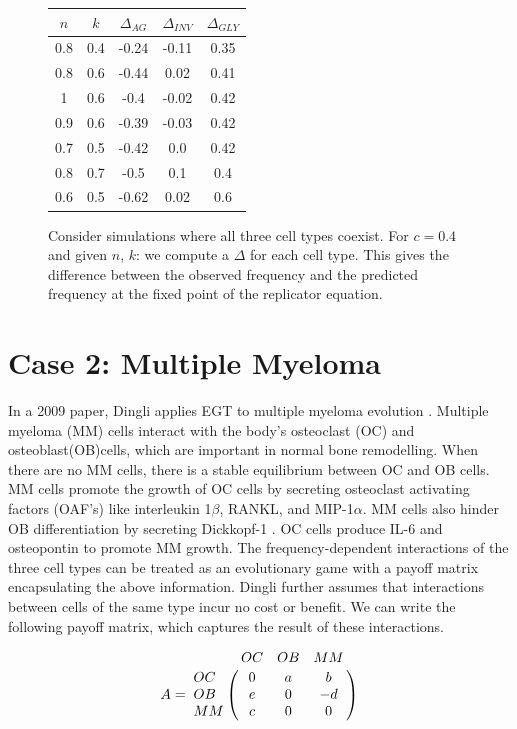 \documentclass[12pt]{report}
\begin{document}
\begin{figure}
\centering
\begin{tabular}{ | c | c | c | c | c |}
\hline
$n$ & $k$ & $\Delta_{AG}$ & $\Delta_{INV}$ & $\Delta_{GLY}$ \\
\hline
0.8 & 0.4 & -0.24 & -0.11 & 0.35 \\
\hline
0.8 & 0.6 & -0.44 & 0.02 & 0.41\\ 
\hline
1 &  0.6 & -0.4 & -0.02 & 0.42 \\
\hline
0.9 & 0.6 & -0.39 & -0.03 & 0.42 \\
\hline
0.7 & 0.5 & -0.42 & 0.0 & 0.42 \\ 
\hline
0.8 & 0.7 & -0.5 & 0.1 & 0.4 \\ 
\hline
0.6 & 0.5 & -0.62 & 0.02 & 0.6 \\ 
\hline
\end{tabular}
\caption{Consider simulations where  all three cell types coexist. For $c = 0.4$ and given $n$, $k$: we compute a $\Delta$ for each cell type. This gives the difference between the observed frequency and the predicted frequency at the fixed point of the replicator equation.}
\end{figure}

\section*{Case 2: Multiple Myeloma}
In a 2009 paper, Dingli applies EGT to multiple myeloma evolution \cite{Dingli2009}. Multiple myeloma (MM) cells interact with the body's osteoclast (OC) and osteoblast(OB)cells, which are important in normal bone remodelling. When there are no MM cells, there is a stable equilibrium between OC and OB cells. MM cells promote the growth of OC cells by secreting osteoclast activating factors (OAF's) like interleukin  1$\beta$, RANKL, and MIP-1$\alpha$. MM cells also hinder OB differentiation by secreting Dickkopf-1 \cite{Dingli2009}. OC cells produce IL-6 and osteopontin to promote MM growth. The frequency-dependent interactions of the three cell types can be treated as an evolutionary game with a payoff matrix encapsulating the above information. Dingli further assumes that interactions between cells of the same type incur no cost or benefit. We can write the following payoff matrix, which captures the result of these interactions. 

$$A = \bordermatrix{\text{}&OC&OB&MM\cr
                OC& 0 & a& b \cr
                OB& e  &  0 & -d \cr
                MM& c & 0 & 0 \cr
               }$$
\end{document}
